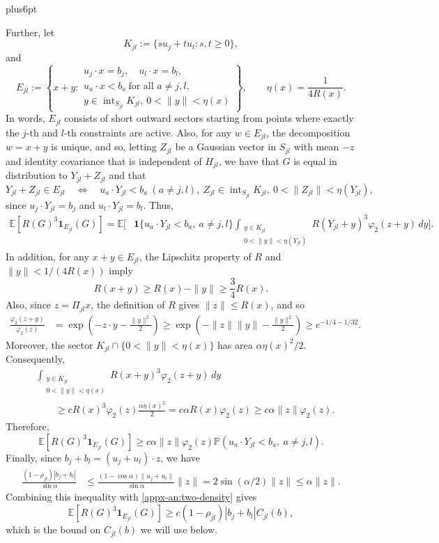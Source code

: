 \documentclass[11pt,letterpaper,twoside,leqno]{article}
\makeatletter
\theoremstyle{bookplain}
\theoremstyle{bookremark}
\renewenvironment{proof}[1][\proofname]{\par
  \pushQED{\qed}\normalfont\topsep6pt plus6pt\relax
  \trivlist\item[\hskip\labelsep\bfseries #1\@addpunct{.}]\ignorespaces
}{\popQED\endtrivlist\@endpefalse}
\newcommand{\E}{\mathbb E}
\newcommand{\Pp}{\mathbb P}
\newcommand{\ind}{\mathbf 1}
\makeatother
\begin{document}
\begin{proof}
Further, let
\[
K_{jl}:=\{s u_j+t u_l: s,t\ge0\},
\]
and
\[
E_{jl}:=\left\{
x+y:
\begin{array}{l}
u_j\cdot x=b_j,\quad u_l\cdot x=b_l,\\
u_a\cdot x<b_a\ \text{for all }a\ne j,l,\\
y\in\operatorname{int}_{S_{jl}}K_{jl},\
0<\|y\|<\eta(x)
\end{array}
\right\},
\qquad
\eta(x)=\frac1{4R(x)}.
\]
In words, \(E_{jl}\) consists of short outward sectors
starting from points where exactly the \(j\)-th and
\(l\)-th constraints are active. Also, for any $w\in E_{jl}$, the decomposition $w = x+y$ is unique, and so, letting \(Z_{jl}\) be a Gaussian vector in \(S_{jl}\)
with mean \(-z\) and identity covariance that is independent
of \(H_{jl}\), we have that $G$ is equal in distribution to \(Y_{jl}+Z_{jl}\) and that
\[
Y_{jl}+Z_{jl}\in E_{jl}
\quad\Longleftrightarrow\quad
u_a\cdot Y_{jl}<b_a\ (a\ne j,l),\
Z_{jl}\in \operatorname{int}_{S_{jl}}K_{jl},\
0<\|Z_{jl}\|<\eta(Y_{jl}),
\]
since $u_j\cdot Y_{jl} = b_j$ and $u_l\cdot Y_{jl} = b_l$. Thus,
\[
\begin{aligned}
\E[R(G)^3\ind_{E_{jl}}(G)]
=\E\bigg[
&\ind\{u_a\cdot Y_{jl}<b_a,\ a\ne j,l\}\int_{\substack{y\in K_{jl}\\
                 0<\|y\|<\eta(Y_{jl})}}
R(Y_{jl}+y)^3\varphi_2(z+y)\,dy
\bigg].
\end{aligned}
\]
In addition, for any
\(x+y\in E_{jl}\), the Lipschitz property of \(R\)
and \(\|y\|<1/(4R(x))\) imply
\[
R(x+y)\ge R(x)-\|y\|\ge\frac34R(x).
\]
Also, since \(z=\Pi_{jl}x\), the definition of \(R\)
gives \(\|z\|\le R(x)\), and so
\[
\begin{aligned}
\frac{\varphi_2(z+y)}{\varphi_2(z)}
&=\exp\left(-z\cdot y-\frac{\|y\|^2}{2}\right)\ge\exp\left(-\|z\|\|y\|-\frac{\|y\|^2}{2}\right)
\ge e^{-1/4-1/32}.
\end{aligned}
\]
Moreover, the sector \(K_{jl}\cap\{0<\|y\|<\eta(x)\}\)
has area \(\alpha\eta(x)^2/2\). Consequently,
\[
\begin{aligned}
&\int_{\substack{y\in K_{jl}\\
                 0<\|y\|<\eta(x)}}
R(x+y)^3\varphi_2(z+y)\,dy\\
&\qquad\ge
cR(x)^3\varphi_2(z)\frac{\alpha\eta(x)^2}{2}
=c\alpha R(x)\varphi_2(z)
\ge c\alpha\|z\|\varphi_2(z).
\end{aligned}
\]
Therefore,
\[
\E[R(G)^3\ind_{E_{jl}}(G)]
\ge c\alpha\|z\|\varphi_2(z)
\Pp(u_a\cdot Y_{jl}<b_a,\ a\ne j,l).
\]
Finally, since \(b_j+b_l=(u_j+u_l)\cdot z\), we have
\[
\begin{aligned}
\frac{(1-\rho_{jl})|b_j+b_l|}{\sin\alpha}
&\le
\frac{(1-\cos\alpha)\|u_j+u_l\|}{\sin\alpha}
\|z\| =2\sin(\alpha/2)\|z\|
\le\alpha\|z\|.
\end{aligned}
\]
Combining this inequality with
\eqref{appx-an:two-density} gives
\begin{equation}
\E[R(G)^3\ind_{E_{jl}}(G)]
\ge c(1-\rho_{jl})|b_j+b_l|C_{jl}(b),
\label{appx-an:two-region}
\end{equation}
which is the bound on $C_{jl}(b)$ we will use below.





\end{proof}
\end{document}
